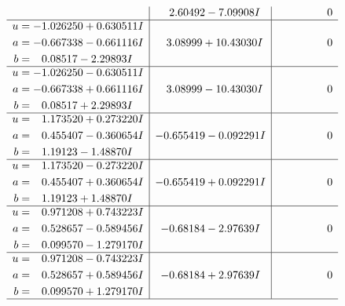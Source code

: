 \documentclass[1p]{elsarticle_modified}
\theoremstyle{definition}
\begin{document}
$$\begin{array}{c|c|c}
 & \phantom{-}2.60492 - 7.09908 I & \phantom{-0.000000 } 0 \\ \hline\begin{aligned}
u &= -1.026250 + 0.630511 I \\
a &= -0.667338 - 0.661116 I \\
b &= \phantom{-}0.08517 - 2.29893 I\end{aligned}
 & \phantom{-}3.08999 + 10.43030 I & \phantom{-0.000000 } 0 \\ \hline\begin{aligned}
u &= -1.026250 - 0.630511 I \\
a &= -0.667338 + 0.661116 I \\
b &= \phantom{-}0.08517 + 2.29893 I\end{aligned}
 & \phantom{-}3.08999 - 10.43030 I & \phantom{-0.000000 } 0 \\ \hline\begin{aligned}
u &= \phantom{-}1.173520 + 0.273220 I \\
a &= \phantom{-}0.455407 - 0.360654 I \\
b &= \phantom{-}1.19123 - 1.48870 I\end{aligned}
 & -0.655419 - 0.092291 I & \phantom{-0.000000 } 0 \\ \hline\begin{aligned}
u &= \phantom{-}1.173520 - 0.273220 I \\
a &= \phantom{-}0.455407 + 0.360654 I \\
b &= \phantom{-}1.19123 + 1.48870 I\end{aligned}
 & -0.655419 + 0.092291 I & \phantom{-0.000000 } 0 \\ \hline\begin{aligned}
u &= \phantom{-}0.971208 + 0.743223 I \\
a &= \phantom{-}0.528657 - 0.589456 I \\
b &= \phantom{-}0.099570 - 1.279170 I\end{aligned}
 & -0.68184 - 2.97639 I & \phantom{-0.000000 } 0 \\ \hline\begin{aligned}
u &= \phantom{-}0.971208 - 0.743223 I \\
a &= \phantom{-}0.528657 + 0.589456 I \\
b &= \phantom{-}0.099570 + 1.279170 I\end{aligned}
 & -0.68184 + 2.97639 I & \phantom{-0.000000 } 0\\
 \hline 
 \end{array}$$\newpage$$\begin{array}{c|c|c}  

\end{array}$$
\end{document}
